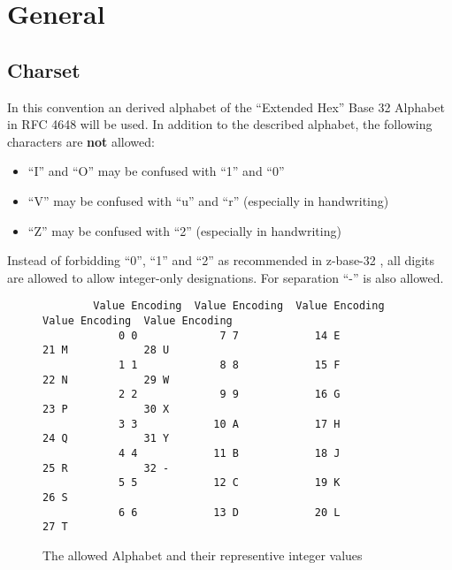 %
%
%
%
%
%
%

\section{General}


\subsection{Charset}

In this convention an derived alphabet of the ``Extended Hex'' Base 32 Alphabet
in RFC 4648 \cite{RFC-4648} will be used. In addition to the described alphabet,
the following characters are \textbf{not} allowed:

\begin{itemize}
	\item ``I'' and ``O'' may be confused with ``1'' and ``0''
	\item ``V'' may be confused with ``u'' and ``r'' (especially in handwriting)
	\item ``Z'' may be confused with ``2'' (especially in handwriting)
\end{itemize}

Instead of forbidding ``0'', ``1'' and ``2'' as recommended in z-base-32
\cite{z-base-32}, all digits are allowed to allow integer-only designations.
For separation ``-'' is also allowed.


\begin{figure}[H]
	\label{charset}

	\begin{verbatim}
		Value Encoding  Value Encoding  Value Encoding  Value Encoding  Value Encoding
		    0 0             7 7            14 E            21 M            28 U
		    1 1             8 8            15 F            22 N            29 W
		    2 2             9 9            16 G            23 P            30 X
		    3 3            10 A            17 H            24 Q            31 Y
		    4 4            11 B            18 J            25 R            32 -
		    5 5            12 C            19 K            26 S
		    6 6            13 D            20 L            27 T
	\end{verbatim}

	\caption{The allowed Alphabet and their representive integer values}
\end{figure}


